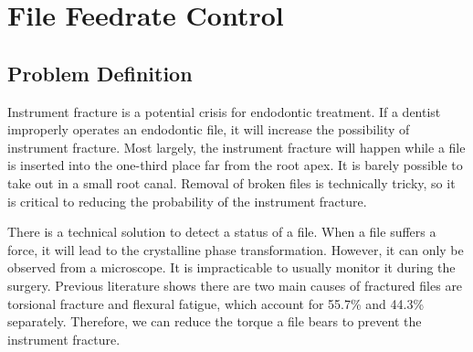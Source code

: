 \chapter{File Feedrate Control}
\section{Problem Definition}
\hspace*{6mm}Instrument fracture is a potential crisis for endodontic treatment. If a dentist improperly operates an endodontic file, it will increase the possibility of instrument fracture. Most largely, the instrument fracture will happen while a file is inserted into the one-third place far from the root apex. It is barely possible to take out in a small root canal. Removal of broken files is technically tricky, so it is critical to reducing the probability of the instrument fracture.
\par

There is a technical solution to detect a status of a file. When a file suffers a force, it will lead to the crystalline phase transformation. However, it can only be observed from a microscope. It is impracticable to usually monitor it during the surgery. Previous literature shows there are two main causes of fractured files are torsional fracture and flexural fatigue, which account for 55.7\% and 44.3\% separately\cite{SATTAPAN2000161}. Therefore, we can reduce the torque a file bears to prevent the instrument fracture.

